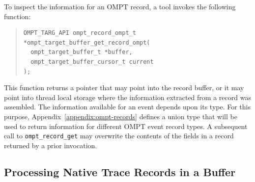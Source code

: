 \documentclass{article}
\begin{document}
To inspect the information for an OMPT record, a tool invokes the following function:
\begin{quote}
\begin{lstlisting}
OMPT_TARG_API ompt_record_ompt_t *ompt_target_buffer_get_record_ompt(
  ompt_target_buffer_t *buffer, 
  ompt_target_buffer_cursor_t current
);
\end{lstlisting}
\end{quote}
This function returns a pointer that may point into the record buffer, or it may point into thread local storage where the information extracted from a record was assembled. The information available for an event depends upon its type. For this purpose, Appendix~\ref{appendix:ompt-records} defines a union type that will be used to return information for different OMPT event record types. A subsequent call to \lstinline|ompt_record_get| may overwrite the contents of the fields in a record returned by a prior invocation.

\subsection{Processing Native Trace Records in a Buffer}
\label{sec:native-record-data}
\end{document}

